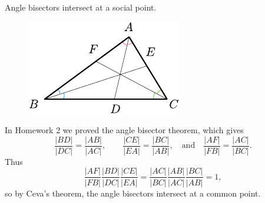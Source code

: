 \documentclass[twoside,10pt]{article}
\begin{document}
\newpage

\begin{exer}[1.169]
Angle bisectors intersect at a social point.
\end{exer}

\begin{figure}[H]
	\centering
	\includegraphics[scale=1.5]{fig/169.pdf}
\end{figure}

In Homework 2 we proved the angle bisector theorem, which gives
\[
	\frac{|BD|}{|DC|} = \frac{|AB|}{|AC|} , \qquad \frac{|CE|}{|EA|} = \frac{|BC|}{|AB|} , \quad\text{and} \quad \frac{|AF|}{|FB|} = \frac{|AC|}{|BC|} .
\] Thus
\[
	\frac{|AF|}{|FB|} \frac{|BD|}{|DC|} \frac{|CE|}{|EA|} = \frac{|AC|}{|BC|} \frac{|AB|}{|AC|} \frac{|BC|}{|AB|} = 1,
\] so by Ceva's theorem, the angle bisectors intersect at a common point.

\newpage
\end{document}
